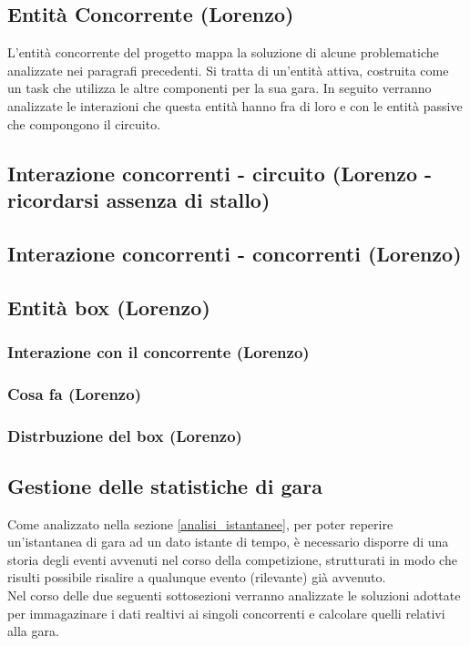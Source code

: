 \subsection{Entit\`{a} Concorrente (Lorenzo)}
L'entità concorrente del progetto mappa la soluzione di alcune problematiche analizzate nei paragrafi precedenti. Si tratta di un'entità attiva, costruita come un task che utilizza le altre componenti per la sua gara. In seguito verranno analizzate le interazioni che questa entità hanno fra di loro e con le entità passive che compongono il circuito.
\subsection{Interazione concorrenti - circuito (Lorenzo - ricordarsi assenza di stallo)}
\subsection{Interazione concorrenti - concorrenti (Lorenzo)}
\subsection{Entità box (Lorenzo)}
     \subsubsection{Interazione con il concorrente (Lorenzo)}
     \subsubsection{Cosa fa (Lorenzo)}
     \subsubsection{Distrbuzione del box (Lorenzo)}
\subsection{Gestione delle statistiche di gara}
Come analizzato nella sezione \ref{analisi_istantanee}, per poter reperire un'istantanea di gara ad un dato istante di tempo, è necessario
disporre di una storia degli eventi avvenuti nel corso della competizione, strutturati in modo che risulti possibile risalire a qualunque evento
(rilevante) già avvenuto.\\ 
Nel corso delle due seguenti sottosezioni verranno analizzate le soluzioni adottate per immagazinare i dati realtivi ai singoli concorrenti
e calcolare quelli relativi alla gara.

